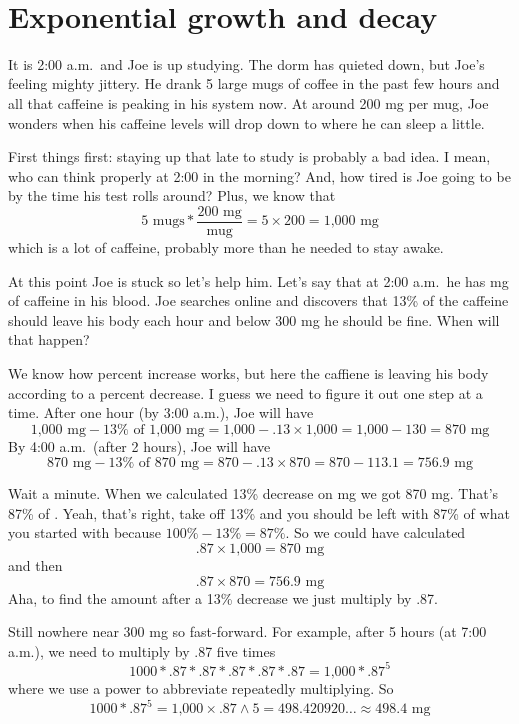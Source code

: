  ~\vspace{.1in}
 
 \section{Exponential growth and decay}

It is 2:00 a.m.\ and Joe is up studying.  The dorm has quieted down, but Joe's feeling mighty jittery.  He  drank 5 large mugs of coffee in the past few hours and all that caffeine is peaking in his system now.  At around 200 mg per mug, Joe wonders when his caffeine levels will drop down to where he can sleep a little.  

First things first:  staying up that late to study is probably a bad idea.  I mean, who can think properly at 2:00 in the morning?  And, how tired is Joe going to be by the time his test rolls around?  Plus, we know that
$$5 \text{ mugs} \ast \frac{200 \text{ mg}}{\text{mug}} = 5 \times 200 = \text{1,000 mg}$$
which is a lot of caffeine, probably more than he needed to stay awake.  

At this point Joe is stuck so let's help him. Let's say that at 2:00 a.m.\ he has  mg of caffeine in his blood.  Joe searches online and discovers that 13\% of the caffeine should leave his body each hour and below 300 mg he should be fine.  When will that happen?

We know how percent increase works, but here the caffiene is leaving his body according to a percent decrease.  I guess we need to figure it out one step at a time.  After one hour (by 3:00 a.m.), Joe will have 
$$  \text{1,000} \text{ mg} - 13 \% \text{ of }  \text{1,000} \text{ mg} =  \text{1,000}- .13 \times  \text{1,000} =  \text{1,000} - 130 = 870 \text{ mg}$$
By 4:00 a.m.\ (after 2 hours), Joe will have
$$ 870 \text{ mg} - 13 \% \text{ of } 870 \text{ mg} = 870 - .13 \times 870 = 870 - 113.1 =  756.9 \text{ mg}$$

Wait a minute.  When we calculated 13\% decrease on   mg we got 870 mg.  That's 87\% of .  Yeah, that's right, take off 13\% and you should be left with 87\% of what you started with because $100\% - 13\% = 87\%$.
So we could have calculated 
$$ .87 \times \text{1,000} = 870 \text{ mg}$$
and then $$.87 \times 870 = 756.9 \text{ mg}$$
Aha, to find the amount after a 13\% decrease we just multiply by .87.

Still nowhere near 300 mg so fast-forward.  For example, after 5 hours (at 7:00 a.m.), we need to multiply   by .87 five times
$$1000 \ast .87 \ast .87 \ast .87 \ast .87 \ast .87=  \text{1,000} \ast .87^5$$
where we use a power to abbreviate repeatedly multiplying.  So
$$1000 \ast .87^5 =  \text{1,000} \times .87 \wedge 5 = 498.420920\ldots \approx 498.4 \text{ mg}$$

